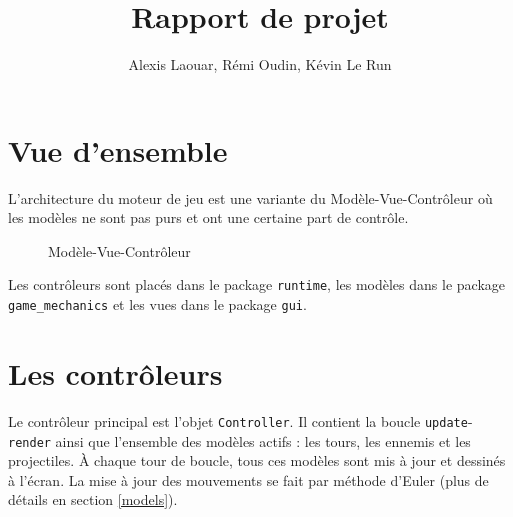 \documentclass[a4paper,11pt]{article}
\begin{document}
\title{Rapport de projet}
\author{Alexis Laouar, Rémi Oudin, Kévin Le Run}
\date{}
\maketitle

\section{Vue d'ensemble}

L'architecture du moteur de jeu est une variante du Modèle-Vue-Contrôleur où les
modèles ne sont pas purs et ont une certaine part de contrôle.

\begin{figure}[h]
  \centering
  \caption{Modèle-Vue-Contrôleur}
\end{figure}

Les contrôleurs sont placés dans le package \texttt{runtime}, les modèles dans
le package \texttt{game\_mechanics} et les vues dans le package \texttt{gui}.

\section{Les contrôleurs}

Le contrôleur principal est l'objet \texttt{Controller}. Il contient la boucle
\texttt{update}-\texttt{render} ainsi que l'ensemble des modèles actifs :
les tours, les ennemis et les projectiles. À chaque tour de boucle, tous ces
modèles sont mis à jour et dessinés à l'écran. La mise à jour des mouvements se
fait par méthode d'Euler (plus de détails en section \ref{models}).
\end{document}

